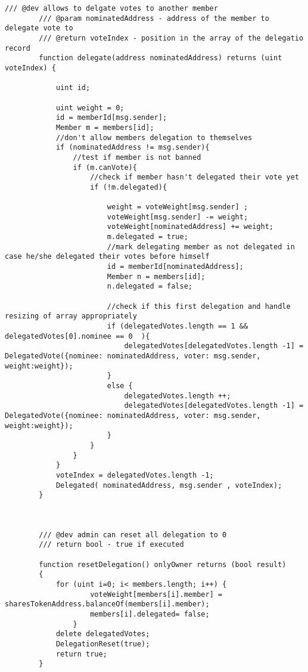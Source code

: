 \documentclass{article}
\begin{document}
\begin{lstlisting}[style=MyCStyle]
        /// @dev allows to delgate votes to another member
        /// @param nominatedAddress - address of the member to delegate vote to
        /// @return voteIndex - position in the array of the delegatio record
        function delegate(address nominatedAddress) returns (uint voteIndex) {

            uint id;

            uint weight = 0;
            id = memberId[msg.sender];
            Member m = members[id];
            //don't allow members delegation to themselves
            if (nominatedAddress != msg.sender){
                //test if member is not banned
                if (m.canVote){
                    //check if member hasn't delegated their vote yet
                    if (!m.delegated){

                        weight = voteWeight[msg.sender] ;
                        voteWeight[msg.sender] -= weight;
                        voteWeight[nominatedAddress] += weight;
                        m.delegated = true;
                        //mark delegating member as not delegated in case he/she delegated their votes before himself
                        id = memberId[nominatedAddress];
                        Member n = members[id];
                        n.delegated = false;

                        //check if this first delegation and handle resizing of array appropriately
                        if (delegatedVotes.length == 1 && delegatedVotes[0].nominee == 0  ){
                            delegatedVotes[delegatedVotes.length -1] = DelegatedVote({nominee: nominatedAddress, voter: msg.sender, weight:weight});
                        }
                        else {
                            delegatedVotes.length ++;
                            delegatedVotes[delegatedVotes.length -1] = DelegatedVote({nominee: nominatedAddress, voter: msg.sender, weight:weight});
                        }
                    }
                }
            }
            voteIndex = delegatedVotes.length -1;
            Delegated( nominatedAddress, msg.sender , voteIndex);
        }



        /// @dev admin can reset all delegation to 0
        /// return bool - true if executed

        function resetDelegation() onlyOwner returns (bool result)
        {
            for (uint i=0; i< members.length; i++) {
                    voteWeight[members[i].member] = sharesTokenAddress.balanceOf(members[i].member);
                    members[i].delegated= false;
                }
            delete delegatedVotes;
            DelegationReset(true);
            return true;
        }



\end{lstlisting}
\end{document}
